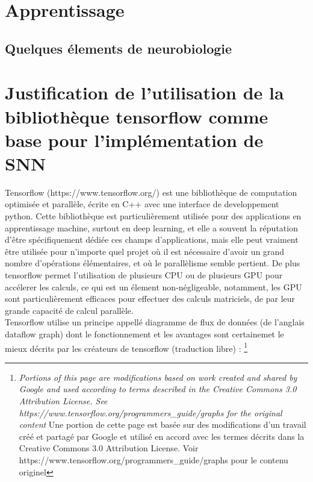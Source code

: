 \documentclass[12pt]{scrartcl}
\begin{document}
\section{Apprentissage}
\subsection{Quelques élements de neurobiologie}

\section{Justification de l'utilisation de la bibliothèque tensorflow comme base pour l'implémentation de SNN}
Tensorflow (https://www.tensorflow.org/) est une bibliothèque de computation optimisée et parallèle, écrite en C++ avec une interface de developpement python. Cette bibliothèque est particulièrement utilisée pour des applications en apprentissage machine, surtout en deep learning, et elle a souvent la réputation d'être spécifiquement dédiée ces champs d'applications, mais elle peut vraiment être utilisée pour n'importe quel projet où il est nécessaire d'avoir un grand nombre d'opérations élémentaires, et où le parallèlisme semble pertient. De plus tensorflow permet l'utilisation de plusieurs CPU ou de plusieurs GPU pour accélerer les calculs, ce qui est un élement non-négligeable, notamment, les GPU sont particulièrement efficaces pour effectuer des calculs matriciels, de par leur grande capacité de calcul parallèle.\\


Tensorflow utilise un principe appellé diagramme de flux de données (de l'anglais dataflow graph) dont le fonctionnement et les avantages sont certainemet le mieux décrits par les créateurs de tensorflow (traduction libre) : \footnote{\textit{Portions of this page are modifications based on work created and shared by Google and used according to terms described in the Creative Commons 3.0 Attribution License. See https://www.tensorflow.org/programmers\_guide/graphs for the original content} Une portion de cette page est basée sur des modifications d'un travail créé et partagé par Google et utilisé en accord avec les termes décrits dans la Creative Commons 3.0 Attribution License. Voir https://www.tensorflow.org/programmers\_guide/graphs pour le contenu originel }
\end{document}
